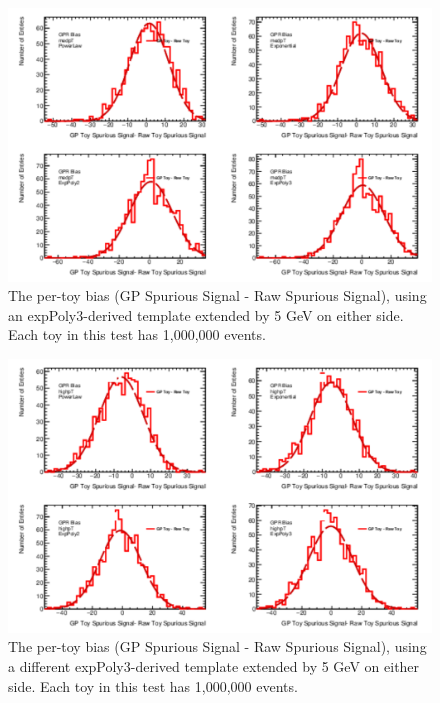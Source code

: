 \begin{figure} 
\begin{center}
  \includegraphics[width=\textwidth]{figures/background/gpr/validation/padded/ToyTest_FitSigBiases_medpT_1M_noSig}   
\caption{The per-toy bias (GP Spurious Signal - Raw Spurious Signal), using an expPoly3-derived template extended by 5 GeV on either side. Each toy in this test has 1,000,000 events.}
\label{fig:bias_padded_medpt_1M_noSig}
\end{center}
\end{figure}

\begin{figure} 
\begin{center}
  \includegraphics[width=\textwidth]{figures/background/gpr/validation/padded/ToyTest_FitSigBiases_highpT_1M_noSig}   
\caption{The per-toy bias (GP Spurious Signal - Raw Spurious Signal), using a different expPoly3-derived template extended by 5 GeV on either side. Each toy in this test has 1,000,000 events.}
\label{fig:bias_padded_highpt_1M_noSig}
\end{center}
\end{figure}

